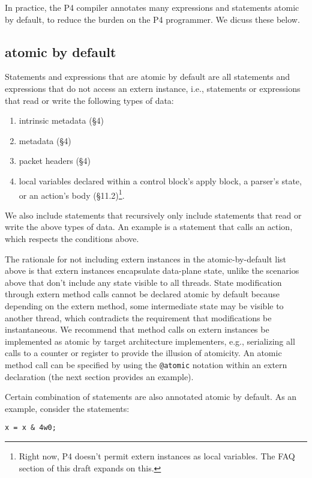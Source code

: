 In practice, the P4 compiler annotates many expressions and statements atomic
by default, to reduce the burden on the P4 programmer. We dicuss these below.

\subsection{atomic by default}
Statements and expressions that are atomic by default are all statements and
expressions that do not access an extern instance, i.e., statements or
expressions that read or write the following types of data:
\begin{enumerate}
\item intrinsic metadata (\S4)
\item metadata (\S4)
\item packet headers (\S4)
\item local variables declared within a control block's apply block, a parser's
state, or an action's body (\S11.2)\footnote{Right now, P4 doesn't permit
extern instances as local variables. The FAQ section of this draft expands on
this.}.

\end{enumerate}
We also include statements that recursively only include statements that read
or write the above types of data. An example is a statement that calls an action,
which respects the conditions above.

The rationale for not including extern instances in the atomic-by-default list above
 is that extern instances
encapsulate data-plane state, unlike the scenarios above that don't include any
state visible to all threads. State modification through extern method calls
cannot be declared atomic by default because depending on the extern method,
some intermediate state may be visible to another thread, which contradicts the
requirement that modifications be instantaneous. We recommend that method calls
on extern instances be implemented as atomic by target architecture
implementers, e.g., serializing all calls to a counter or register to provide
the illusion of atomicity. An atomic method call can be specified by using the
\texttt{@atomic} notation within an extern declaration (the next section provides
an example).

Certain combination of statements are also annotated atomic by default. As an
example, consider the statements:
\begin{verbatim}
x = x & 4w0;
\end{verbatim}

